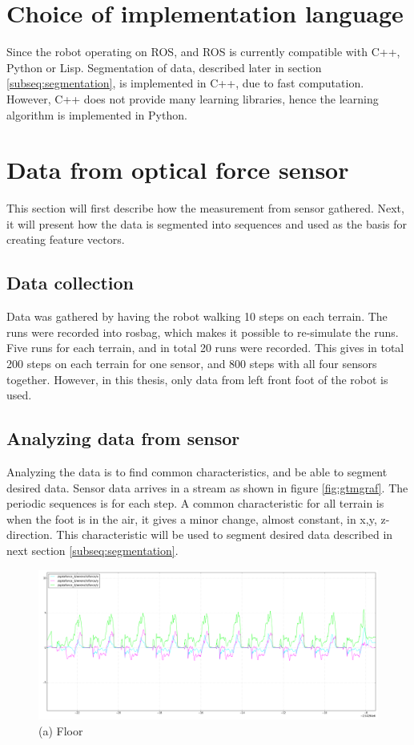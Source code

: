 \documentclass[USenglish]{ifimaster}  %
\begin{document}
\section{Choice of implementation language}
Since the robot operating on ROS, and ROS is currently compatible with C++, Python or Lisp. Segmentation of data, described later in section \ref{subseq:segmentation}, is implemented in C++, due to fast computation. However, C++ does not provide many learning libraries, hence the learning algorithm is implemented in Python. 
			
\section{Data from optical force sensor}
This section will first describe how the measurement from sensor gathered. Next, it will present how the data is segmented into sequences and used as the basis for creating feature vectors.
	
\subsection{Data collection}
Data was gathered by having the robot walking 10 steps on each terrain. The runs were recorded into rosbag, which makes it possible to re-simulate the runs. Five runs for each terrain, and in total 20 runs were recorded. This gives in total 200 steps on each terrain for one sensor, and 800 steps with all four sensors together. However, in this thesis, only data from left front foot of the robot is used.
	
\subsection{Analyzing data from sensor}\label{sec:analyzopto}
Analyzing the data is to find common characteristics, and be able to segment desired data. Sensor data arrives in a stream as shown in figure \ref{fig:gtmgraf}. The periodic sequences is for each step. A common characteristic for all terrain is when the foot is in the air, it gives a minor change, almost constant, in x,y, z-direction. This characteristic will be used to segment desired data described in next section \ref{subseq:segmentation}. 


\begin{figure}[h]
	\centering
	\includegraphics[width=\textwidth,height=\textheight,keepaspectratio]{Figures/gulvgraf}
	\captionsetup{labelformat=empty}
	\caption{(a) Floor}
	\label{fig:gulvgraf}
\end{figure}
\end{document}
